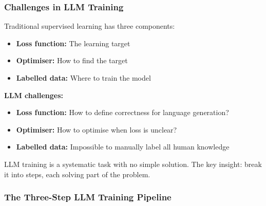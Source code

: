 \bigseparator

\subsubsection{Challenges in LLM Training}

\begin{defbox}
Traditional supervised learning has three components:
\begin{itemize}
  \item \textbf{Loss function:} The learning target
  \item \textbf{Optimiser:} How to find the target
  \item \textbf{Labelled data:} Where to train the model
\end{itemize}

\textbf{LLM challenges:}
\begin{itemize}
  \item \textbf{Loss function:} How to define correctness for language generation?
  \item \textbf{Optimiser:} How to optimise when loss is unclear?
  \item \textbf{Labelled data:} Impossible to manually label all human knowledge
\end{itemize}
\end{defbox}

\begin{tipbox}
LLM training is a systematic task with no simple solution. The key insight: break it into steps, each solving part of the problem.
\end{tipbox}

\bigseparator

\subsubsection{The Three-Step LLM Training Pipeline}

